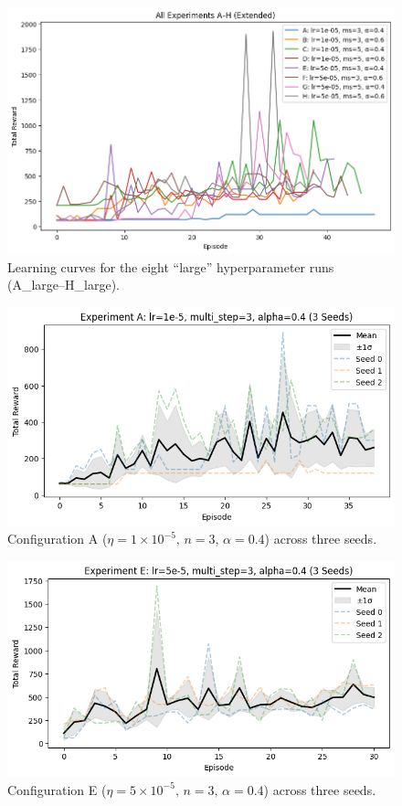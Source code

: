 \documentclass{article}
\begin{document}
\begin{figure}[htbp]
  \centering
  \includegraphics[width=0.9\linewidth]{rainbow_8Extended.png}
  \caption{Learning curves for the eight “large” hyperparameter runs (A\_large–H\_large).}
  \label{fig:extended_sweep}
\end{figure}

\begin{figure}[htbp]
  \centering
  \includegraphics[width=0.8\linewidth]{rainbow_A_seed.png}
  \caption{Configuration A (\(\eta=1\times10^{-5},\,n=3,\,\alpha=0.4\)) across three seeds.}
  \label{fig:seed_A}
\end{figure}

\begin{figure}[htbp]
  \centering
  \includegraphics[width=0.8\linewidth]{rainbow_E_Seed.png}
  \caption{Configuration E (\(\eta=5\times10^{-5},\,n=3,\,\alpha=0.4\)) across three seeds.}
  \label{fig:seed_E}
\end{figure}
\end{document}
